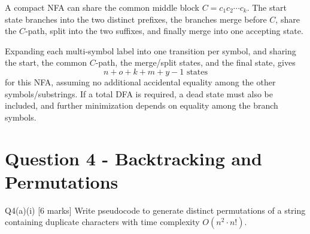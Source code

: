\documentclass[10.5pt,a4paper]{article}
\begin{document}
\begin{answerbox}
A compact NFA can share the common middle block \(C=c_1c_2\cdots c_k\). The start state branches into the two distinct prefixes, the branches merge before \(C\), share the \(C\)-path, split into the two suffixes, and finally merge into one accepting state.

\begin{center}
\end{center}

Expanding each multi-symbol label into one transition per symbol, and sharing the start, the common \(C\)-path, the merge/split states, and the final state, gives
\[
\boxed{n+o+k+m+y-1\text{ states}}
\]
for this NFA, assuming no additional accidental equality among the other symbols/substrings. If a total DFA is required, a dead state must also be included, and further minimization depends on equality among the branch symbols.
\end{answerbox}

\section{Question 4 - Backtracking and Permutations}

\begin{questionbox}{Q4(a)(i) [6 marks]}
Write pseudocode to generate distinct permutations of a string containing duplicate characters with time complexity \(O(n^2\cdot n!)\).
\end{questionbox}
\end{document}
